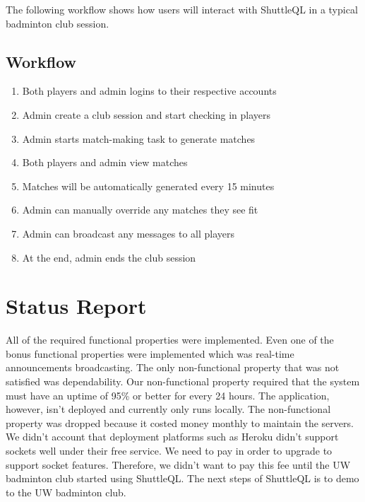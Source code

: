 \documentclass{article}
\begin{document}
The following workflow shows how users will interact with ShuttleQL in a typical badminton club session.
\subsection{Workflow}
\begin{enumerate}
  \item Both players and admin logins to their respective accounts
  \item Admin create a club session and start checking in players
  \item Admin starts match-making task to generate matches
  \item Both players and admin view matches
  \item Matches will be automatically generated every 15 minutes
  \item Admin can manually override any matches they see fit
  \item Admin can broadcast any messages to all players
  \item At the end, admin ends the club session
\end{enumerate}

\section{Status Report}
All of the required functional properties were implemented. Even one of the bonus functional properties were implemented which was real-time announcements broadcasting. The only non-functional property that was not satisfied was dependability. Our non-functional property required that the system must have an uptime of 95\% or better for every 24 hours. The application, however, isn't deployed and currently only runs locally. The non-functional property was dropped because it costed money monthly to maintain the servers. We didn't account that deployment platforms such as Heroku didn't support sockets well under their free service. We need to pay in order to upgrade to support socket features. Therefore, we didn't want to pay this fee until the UW badminton club started using ShuttleQL. The next steps of ShuttleQL is to demo to the UW badminton club.
\end{document}
